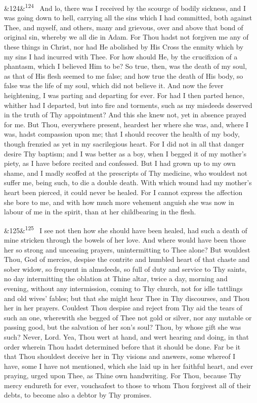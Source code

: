 \documentclass[12pt]{article}
\newcommand{\para}[1][]{\par\noindent\ifx&#1&\else\textsuperscript{\footnotesize #1}~\fi}
\begin{document}
\para[124] And lo, there was I received by the scourge of bodily sickness, and I was going down to hell, carrying all the sins which I had committed, both against Thee, and myself, and others, many and grievous, over and above that bond of original sin, whereby we all die in Adam. For Thou hadst not forgiven me any of these things in Christ, nor had He abolished by His Cross the enmity which by my sins I had incurred with Thee. For how should He, by the crucifixion of a phantasm, which I believed Him to be? So true, then, was the death of my soul, as that of His flesh seemed to me false; and how true the death of His body, so false was the life of my soul, which did not believe it. And now the fever heightening, I was parting and departing for ever. For had I then parted hence, whither had I departed, but into fire and torments, such as my misdeeds deserved in the truth of Thy appointment? And this she knew not, yet in absence prayed for me. But Thou, everywhere present, heardest her where she was, and, where I was, hadst compassion upon me; that I should recover the health of my body, though frenzied as yet in my sacrilegious heart. For I did not in all that danger desire Thy baptism; and I was better as a boy, when I begged it of my mother's piety, as I have before recited and confessed. But I had grown up to my own shame, and I madly scoffed at the prescripts of Thy medicine, who wouldest not suffer me, being such, to die a double death. With which wound had my mother's heart been pierced, it could never be healed. For I cannot express the affection she bore to me, and with how much more vehement anguish she was now in labour of me in the spirit, than at her childbearing in the flesh.

\para[125] I see not then how she should have been healed, had such a death of mine stricken through the bowels of her love. And where would have been those her so strong and unceasing prayers, unintermitting to Thee alone? But wouldest Thou, God of mercies, despise the contrite and humbled heart of that chaste and sober widow, so frequent in almsdeeds, so full of duty and service to Thy saints, no day intermitting the oblation at Thine altar, twice a day, morning and evening, without any intermission, coming to Thy church, not for idle tattlings and old wives' fables; but that she might hear Thee in Thy discourses, and Thou her in her prayers. Couldest Thou despise and reject from Thy aid the tears of such an one, wherewith she begged of Thee not gold or silver, nor any mutable or passing good, but the salvation of her son's soul? Thou, by whose gift she was such? Never, Lord. Yea, Thou wert at hand, and wert hearing and doing, in that order wherein Thou hadst determined before that it should be done. Far be it that Thou shouldest deceive her in Thy visions and answers, some whereof I have, some I have not mentioned, which she laid up in her faithful heart, and ever praying, urged upon Thee, as Thine own handwriting. For Thou, because Thy mercy endureth for ever, vouchsafest to those to whom Thou forgivest all of their debts, to become also a debtor by Thy promises.
\end{document}
